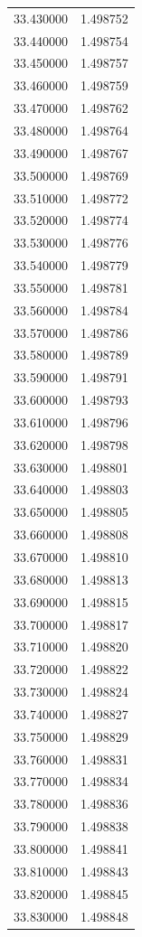 \begin{tabular}{rr}
33.430000 & 1.498752 \\
33.440000 & 1.498754 \\
33.450000 & 1.498757 \\
33.460000 & 1.498759 \\
33.470000 & 1.498762 \\
33.480000 & 1.498764 \\
33.490000 & 1.498767 \\
33.500000 & 1.498769 \\
33.510000 & 1.498772 \\
33.520000 & 1.498774 \\
33.530000 & 1.498776 \\
33.540000 & 1.498779 \\
33.550000 & 1.498781 \\
33.560000 & 1.498784 \\
33.570000 & 1.498786 \\
33.580000 & 1.498789 \\
33.590000 & 1.498791 \\
33.600000 & 1.498793 \\
33.610000 & 1.498796 \\
33.620000 & 1.498798 \\
33.630000 & 1.498801 \\
33.640000 & 1.498803 \\
33.650000 & 1.498805 \\
33.660000 & 1.498808 \\
33.670000 & 1.498810 \\
33.680000 & 1.498813 \\
33.690000 & 1.498815 \\
33.700000 & 1.498817 \\
33.710000 & 1.498820 \\
33.720000 & 1.498822 \\
33.730000 & 1.498824 \\
33.740000 & 1.498827 \\
33.750000 & 1.498829 \\
33.760000 & 1.498831 \\
33.770000 & 1.498834 \\
33.780000 & 1.498836 \\
33.790000 & 1.498838 \\
33.800000 & 1.498841 \\
33.810000 & 1.498843 \\
33.820000 & 1.498845 \\
33.830000 & 1.498848 \\

\end{tabular}

